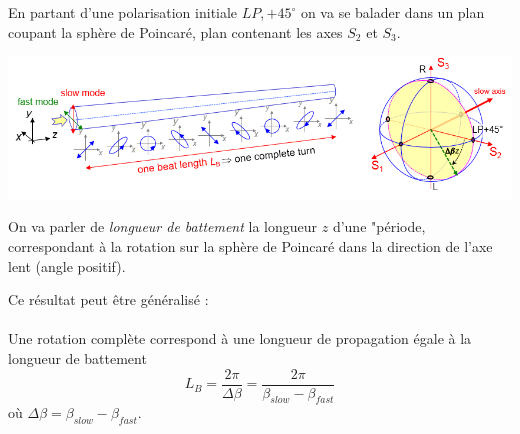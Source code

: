 {	En partant d'une polarisation initiale $LP, +45^\circ$ on va se balader dans un plan coupant la
	sphère de Poincaré, plan contenant les axes $S_2$ et $S_3$.
	\begin{center}
		\includegraphics[scale=0.6]{ch1/image44}
	\end{center}
	On va parler de \textit{longueur de battement} la longueur $z$ d'une "période, correspondant à 
	la rotation sur la sphère de Poincaré dans la direction de l'axe lent (angle positif).}
	
	
	
	\newpage
	Ce résultat peut être généralisé : \\
	
	\ \\
	
	Une rotation complète correspond à une longueur de propagation égale à la longueur de battement
	\begin{equation}
	{L_B} = \frac{{2\pi }}{{\Delta \beta }} = \frac{{2\pi }}{{{\beta _{slow}} - {\beta _{fast}}}}
	\end{equation}
	où $\Delta\beta = \beta_{slow}-\beta_{fast}$.





